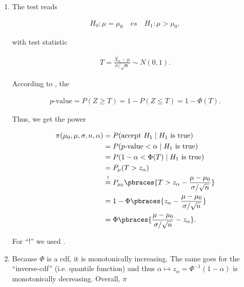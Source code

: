 \begin{solution}

\phantom{}

\begin{enumerate}[label = (\alph*)]

    \item The test reads

    \begin{align*}
        H_0: \mu = \mu_0
        \quad
        \textit{vs}
        \quad
        H_1: \mu > \mu_0,
    \end{align*}
    
    with test statistic
    
    \begin{align*}
        T = \frac{\bar X_n - \mu}{\sigma / \sqrt n} \sim N(0, 1).
    \end{align*}
    
    According to \cite[lecture 9, slide 27]{EStat}, the
    
    \begin{align*}
        \text{$p$-value}
        =
        P(Z \geq T)
        =
        1 - P(Z \leq T)
        =
        1 - \Phi(T).
    \end{align*}
    
    Thus, we get the power
    
    \begin{align*}
        \pi(\mu_0, \mu, \sigma, n, \alpha) 
        & =
        P(\text{accept}~ H_1 \mid H_1 ~\text{is true}) \\
        & =
        P(\text{$p$-value} < \alpha \mid H_1 ~\text{is true}) \\
        & =
        P(1 - \alpha < \Phi(T) \mid H_1 ~\text{is true}) \\
        & =
        P_\mu(T > z_\alpha) \\
        & \stackrel{!}{\approx}
        P_{\mu_0}\pbraces{T > z_\alpha - \frac{\mu - \mu_0}{\sigma/ \sqrt n}} \\
        & =
        1 - \Phi\pbraces{z_\alpha - \frac{\mu - \mu_0}{\sigma/ \sqrt n}} \\
        & =
        \Phi\pbraces{\frac{\mu - \mu_0}{\sigma/ \sqrt n} - z_\alpha}.
    \end{align*}
    
    For \enquote ! we used \cite[lecture 9, slide 46]{EStat}.

    \item Because $\Phi$ is a cdf, it is monotonically increasing.
    The same goes for the \enquote{inverse-cdf} (i.e. quantile function) and thus $\alpha \mapsto z_\alpha = \Phi^{-1}(1 - \alpha)$ is monotonically decreasing.
    Overall, $\pi$


\end{enumerate}
\end{solution}
